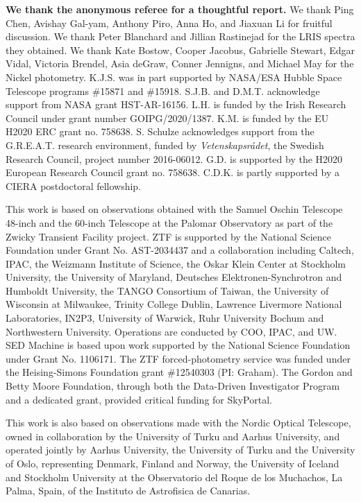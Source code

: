 \documentclass[twocolumn]{aastex631}
\newcommand{\rev}[1]{\textbf{#1}}
\begin{document}
\begin{CJK*}{UTF8}{gbsn}

\rev{We thank the anonymous referee for a thoughtful report.} We thank Ping Chen, Avishay Gal-yam, Anthony Piro, Anna Ho, and Jiaxuan Li for fruitful discussion. We thank Peter Blanchard and Jillian Rastinejad for the LRIS spectra they obtained. We thank Kate Bostow, Cooper Jacobus, Gabrielle Stewart, Edgar Vidal, Victoria Brendel, Asia deGraw, Conner Jennigns, and Michael May for the Nickel photometry. K.J.S. was in part supported by NASA/ESA Hubble Space Telescope programs \#15871 and \#15918. S.J.B. and D.M.T. acknowledge support from NASA grant HST-AR-16156. L.H. is funded by the Irish Research Council under grant number GOIPG/2020/1387. K.M. is funded by the EU H2020 ERC grant no. 758638. S. Schulze acknowledges support from the G.R.E.A.T. research environment, funded by {\em Vetenskapsr\aa det},  the Swedish Research Council, project number 2016-06012. G.D. is supported by the H2020 European Research Council grant no. 758638. C.D.K. is partly supported by a CIERA postdoctoral fellowship.

This work is based on observations obtained with the Samuel Oschin Telescope 48-inch and the 60-inch Telescope at the Palomar Observatory as part of the Zwicky Transient Facility project. ZTF is supported by the National Science Foundation under Grant No. AST-2034437 and a collaboration including Caltech, IPAC, the Weizmann Institute of Science, the Oskar Klein Center at Stockholm University, the University of Maryland, Deutsches Elektronen-Synchrotron and Humboldt University, the TANGO Consortium of Taiwan, the University of Wisconsin at Milwaukee, Trinity College Dublin, Lawrence Livermore National Laboratories, IN2P3, University of Warwick, Ruhr University Bochum and Northwestern University. Operations are conducted by COO, IPAC, and UW.
SED Machine is based upon work supported by the National Science Foundation under Grant No. 1106171. The ZTF forced-photometry service was funded under the Heising-Simons Foundation grant \#12540303 (PI: Graham). The Gordon and Betty Moore Foundation, through both the Data-Driven Investigator Program and a dedicated grant, provided critical funding for SkyPortal.

This work is also based on observations made with the Nordic Optical Telescope, owned in collaboration by the University of Turku and Aarhus University, and operated jointly by Aarhus University, the University of Turku and the University of Oslo, representing Denmark, Finland and Norway, the University of Iceland and Stockholm University at the Observatorio del Roque de los Muchachos, La Palma, Spain, of the Instituto de Astrofisica de Canarias.


\end{CJK*}
\end{document}
